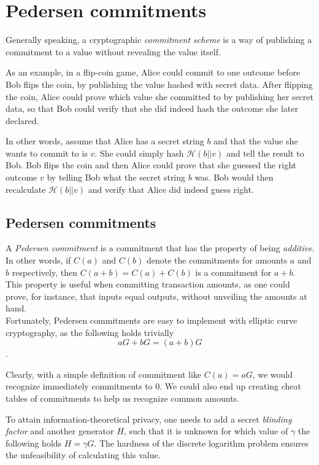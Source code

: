 

\chapter{Pedersen commitments}
\label{chapter:pedersen-commitments}


Generally speaking, a cryptographic {\em commitment scheme} is a way of publishing a commitment to a value without revealing the value itself.

As an example, in a flip-coin game, Alice could commit to one outcome before Bob flips the coin, by publishing the value hashed with secret data. After flipping the coin, Alice could prove which value she committed to by publishing her secret data, so that Bob could verify that she did indeed hash the outcome she later declared.

In other words, assume that Alice has a secret string \(b\) and that the value she wants to commit to is \(v\). She could simply hash \(\mathcal{H}(b || v)\) and tell the result to Bob.
Bob flips the coin and then Alice could prove that she guessed the right outcome \(v\) by telling Bob what the secret string \(b\) was. Bob would then recalculate \(\mathcal{H}(b || v)\) and verify that Alice did indeed guess right.
\\

\section{Pedersen commitments}

A {\em Pedersen commitment} \cite{Pedersen1992} is a commitment that has the property of being {\em additive}. In other words, if \(C(a)\) and \(C(b)\) denote the commitments for amounts \(a\) and \(b\) respectively, then \(C(a + b) = C(a) + C(b)\) is a commitment for \(a + b\).
This property is useful when committing transaction amounts, as one could prove, for instance, that inputs equal outputs, without unveiling the amounts at hand.
\\

Fortunately, Pedersen commitments are easy to implement with elliptic curve cryptography, as the following holds trivially \[a G + b G = (a + b) G\].

Clearly, with a simple definition of commitment like \(C(a) = a G\), we would recognize immediately commitments to 0. 
We could also end up creating cheat tables of commitments to help us recognize common amounts.

To attain information-theoretical privacy, one needs to add a secret {\em blinding factor} and another generator \(H\), such that it is unknown for which value of \(\gamma\) the following holds \(H = \gamma G\). The hardness of the discrete logarithm problem ensures the unfeasibility of calculating this value.

